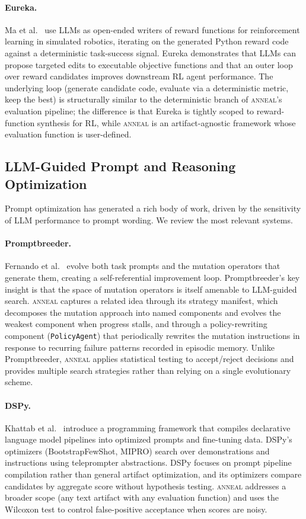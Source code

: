 \paragraph{Eureka.}
Ma et al.~\cite{ma2023eureka} use LLMs as open-ended writers of reward functions for reinforcement learning in simulated robotics, iterating on the generated Python reward code against a deterministic task-success signal.
Eureka demonstrates that LLMs can propose targeted edits to executable objective functions and that an outer loop over reward candidates improves downstream RL agent performance.
The underlying loop (generate candidate code, evaluate via a deterministic metric, keep the best) is structurally similar to the deterministic branch of \textsc{anneal}'s evaluation pipeline; the difference is that Eureka is tightly scoped to reward-function synthesis for RL, while \textsc{anneal} is an artifact-agnostic framework whose evaluation function is user-defined.

\subsection{LLM-Guided Prompt and Reasoning Optimization}

Prompt optimization has generated a rich body of work, driven by the sensitivity of LLM performance to prompt wording.
We review the most relevant systems.

\paragraph{Promptbreeder.}
Fernando et al.~\cite{fernando2024promptbreeder} evolve both task prompts and the mutation operators that generate them, creating a self-referential improvement loop.
Promptbreeder's key insight is that the space of mutation operators is itself amenable to LLM-guided search.
\textsc{anneal} captures a related idea through its strategy manifest, which decomposes the mutation approach into named components and evolves the weakest component when progress stalls, and through a policy-rewriting component (\texttt{PolicyAgent}) that periodically rewrites the mutation instructions in response to recurring failure patterns recorded in episodic memory.
Unlike Promptbreeder, \textsc{anneal} applies statistical testing to accept/reject decisions and provides multiple search strategies rather than relying on a single evolutionary scheme.

\paragraph{DSPy.}
Khattab et al.~\cite{khattab2024dspy} introduce a programming framework that compiles declarative language model pipelines into optimized prompts and fine-tuning data.
DSPy's optimizers (BootstrapFewShot, MIPRO) search over demonstrations and instructions using teleprompter abstractions.
DSPy focuses on prompt pipeline compilation rather than general artifact optimization, and its optimizers compare candidates by aggregate score without hypothesis testing.
\textsc{anneal} addresses a broader scope (any text artifact with any evaluation function) and uses the Wilcoxon test to control false-positive acceptance when scores are noisy.


